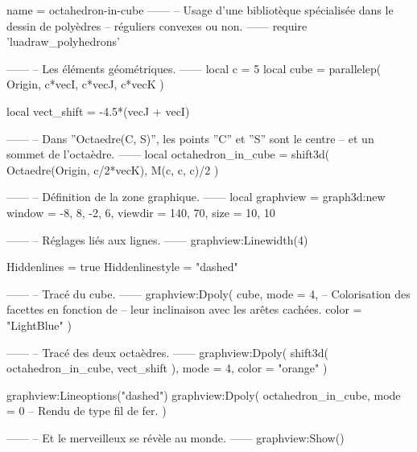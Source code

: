 \documentclass{standalone}
\begin{document}
\begin{luadraw}{name = octahedron-in-cube}
------
-- Usage d'une bibliotèque spécialisée dans le dessin de polyèdres
-- réguliers convexes ou non.
------
require 'luadraw_polyhedrons'

------
-- Les éléments géométriques.
------
local c = 5
local cube = parallelep(
  Origin,
  c*vecI, c*vecJ, c*vecK
)

local vect_shift = -4.5*(vecJ + vecI)

------
-- Dans ''Octaedre(C, S)'', les points ''C'' et ''S'' sont le centre
-- et un sommet de l'octaèdre.
------
local octahedron_in_cube = shift3d(
  Octaedre(Origin, c/2*vecK),
  M(c, c, c)/2
)

------
-- Définition de la zone graphique.
------
local graphview = graph3d:new{
  window  = {-8, 8, -2, 6},
  viewdir = {140, 70},
  size    = {10, 10}
}

------
-- Réglages liés aux lignes.
------
graphview:Linewidth(4)

Hiddenlines     = true
Hiddenlinestyle = "dashed"

------
-- Tracé du cube.
------
graphview:Dpoly(
  cube,
  {
    mode  = 4,  -- Colorisation des facettes en fonction de
                -- leur inclinaison avec les arêtes cachées.
    color = "LightBlue"
  })

------
-- Tracé des deux octaèdres.
------
graphview:Dpoly(
  shift3d(
    octahedron_in_cube,
    vect_shift
  ),
  {
    mode = 4,
    color = "orange"
  })

graphview:Lineoptions("dashed")
graphview:Dpoly(
  octahedron_in_cube,
  {
    mode = 0  -- Rendu de type fil de fer.
  })

------
-- Et le merveilleux se révèle au monde.
------
graphview:Show()
\end{luadraw}
\end{document}
